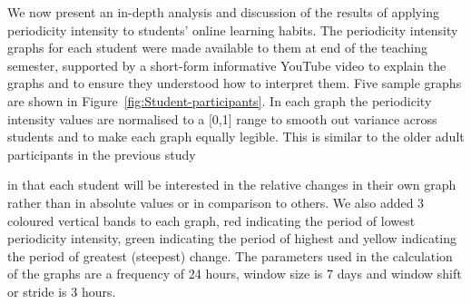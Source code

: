 \documentclass[preprints,article,accept,pdftex,moreauthors]{Definitions/mdpi}
\begin{document}
{We now present an in-depth analysis and discussion of the results of applying periodicity intensity to students' online learning habits.}  The periodicity intensity graphs for each student were made available to them at end of the teaching semester, 
supported by a short-form informative YouTube video to explain the graphs and to ensure they understood how to interpret them.
Five  sample graphs are shown in Figure~\ref{fig:Student-participants}. In each graph the periodicity intensity values are normalised to a [0,1] range to smooth out variance across students and to make each graph equally legible. {This is } similar to the older adult participants in the previous study {{in that} each student will be interested in the relative changes in their own graph rather than in absolute values or {in} comparison to others.  We also added 3 coloured vertical bands to each graph, red indicating the period of lowest periodicity intensity, green indicating the period of highest and yellow indicating the period of greatest (steepest) change. The parameters used in the calculation of the graphs {are} a frequency of 24 hours, window size is 7 days and window shift or stride is 3 hours.

}
\end{document}
